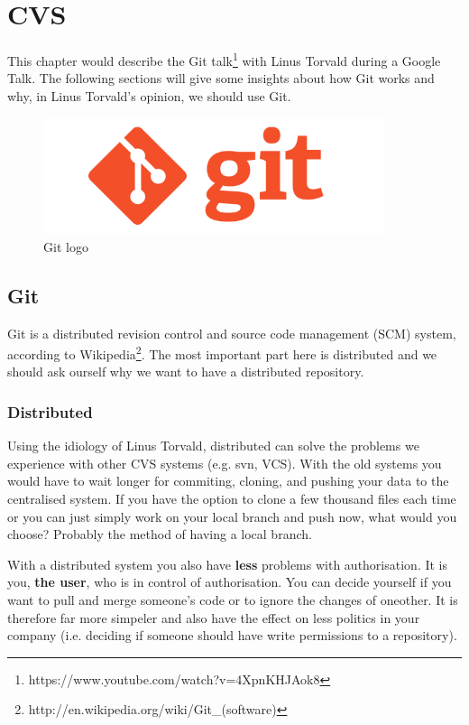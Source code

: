 \chapter{CVS}
\label{chap:cvs}
This chapter would describe the Git talk\footnote{https://www.youtube.com/watch?v=4XpnKHJAok8} with Linus Torvald during a Google Talk. The following sections will give some insights about how Git works and why, in Linus Torvald's opinion, we should use Git.

\begin{figure}[ht]
\begin{center}
\includegraphics[width=10cm]{Chapters/06_git_logo.png}
\end{center}
\caption{Git logo\footnotemark}
\label{img:git-logo}
\end{figure}


\section{Git}
\label{sec:git}
Git is a distributed revision control and source code management (SCM) system, according to Wikipedia\footnote{http://en.wikipedia.org/wiki/Git\_(software)}. The most important part here is distributed and we should ask ourself why we want to have a distributed repository.

\subsection{Distributed}
\label{sec:git-distributed}
Using the idiology of Linus Torvald, distributed can solve the problems we experience with other CVS systems (e.g. svn, VCS). With the old systems you would have to wait longer for commiting, cloning, and pushing your data to the centralised system. If you have the option to clone a few thousand files each time or you can just simply work on your local branch and  push now, what would you choose? Probably the method of having a local branch.

With a distributed system you also have \textbf{less} problems with authorisation. It is you, \textbf{the user}, who is in control of authorisation. You can decide yourself if you want to pull and merge someone's code or to ignore the changes of oneother. It is therefore far more simpeler and also have the effect on less politics in your company (i.e. deciding if someone should have write permissions to a repository).

